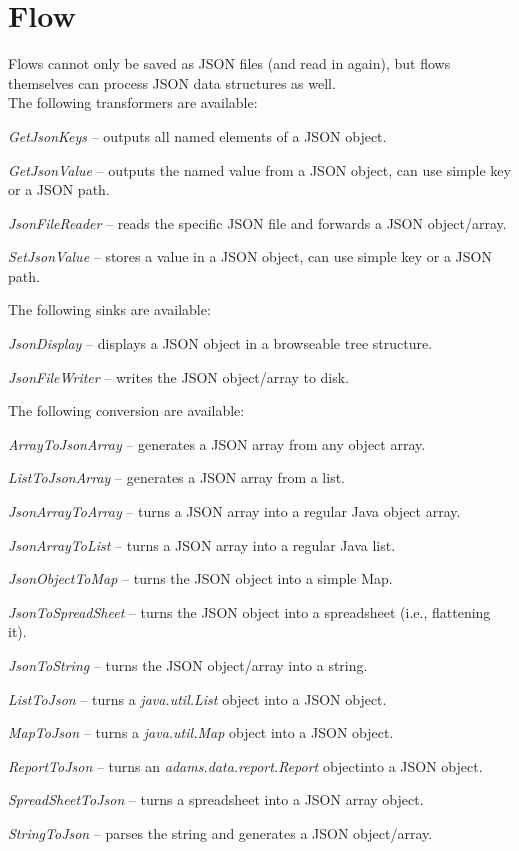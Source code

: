 \documentclass[a4paper]{book}
\begin{document}
\chapter{Flow}
Flows cannot only be saved as JSON\cite{json} files (and read in again), but flows
themselves can process JSON data structures as well. \\
The following transformers are available:
\begin{tight_itemize}
	\item \textit{GetJsonKeys} -- outputs all named elements
	of a JSON object.
	\item \textit{GetJsonValue} -- outputs the named value
	from a JSON object, can use simple key or a JSON
	path\cite{jsonpath}.
	\item \textit{JsonFileReader} -- reads the specific JSON file and forwards
	a JSON object/array.
	\item \textit{SetJsonValue} -- stores a value in a JSON object, can
	use simple key or a JSON path\cite{jsonpath}.
\end{tight_itemize}
The following sinks are available:
\begin{tight_itemize}
	\item \textit{JsonDisplay} -- displays a JSON object in a browseable
	tree structure.
	\item \textit{JsonFileWriter} -- writes the JSON object/array to disk.
\end{tight_itemize}
The following conversion are available:
\begin{tight_itemize}
	\item \textit{ArrayToJsonArray} -- generates a JSON array from any object	array.
	\item \textit{ListToJsonArray} -- generates a JSON array from a list.
	\item \textit{JsonArrayToArray} -- turns a JSON array into a regular Java	object array.
	\item \textit{JsonArrayToList} -- turns a JSON array into a regular Java list.
	\item \textit{JsonObjectToMap} -- turns the JSON object into a simple Map.
	\item \textit{JsonToSpreadSheet} -- turns the JSON object into a spreadsheet (i.e., flattening it).
	\item \textit{JsonToString} -- turns the JSON object/array into a string.
	\item \textit{ListToJson} -- turns a \textit{java.util.List} object	into a JSON object.
	\item \textit{MapToJson} -- turns a \textit{java.util.Map} object	into a JSON object.
	\item \textit{ReportToJson} -- turns an \textit{adams.data.report.Report} objectinto a JSON object.
	\item \textit{SpreadSheetToJson} -- turns a spreadsheet into a JSON array object.
	\item \textit{StringToJson} -- parses the string and generates a JSON	object/array.
\end{tight_itemize}
\end{document}
